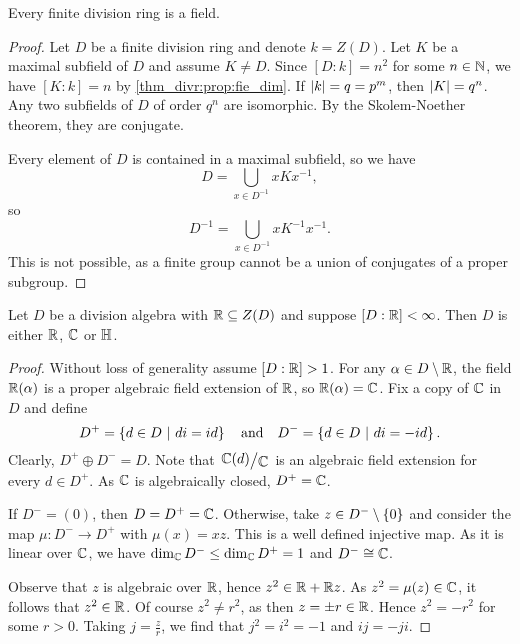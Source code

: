 \begin{izrek}
Every finite division ring is a field.
\end{izrek}

\begin{proof}
Let $D$ be a finite division ring and denote $k = Z(D)$. Let $K$ be
a maximal subfield of $D$ and assume $K \ne D$. Since
$[D : k] = n^2$ for some $n \in \mathbb{N}$, we have $[K : k] = n$ by
\ref{thm_divr:prop:fie_dim}. If $\left\lvert k\right\rvert = q = p^m$, then
$\left\lvert K\right\rvert = q^n$. Any two subfields of $D$ of order $q^n$ are
isomorphic. By the Skolem-Noether theorem, they are conjugate.

Every element of $D$ is contained in a maximal subfield, so we have
\[
D = \bigcup_{x \in D^{-1}} x K x^{-1},
\]
so
\[
D^{-1} = \bigcup_{x \in D^{-1}} x K^{-1} x^{-1}.
\]
This is not possible, as a finite group cannot be a union of
conjugates of a proper subgroup.
\end{proof}

\begin{izrek}[Frobenius]
Let $D$ be a division algebra with $\mathbb{R} \subseteq Z(D)$ and suppose
$[D : \mathbb{R}] < \infty$. Then $D$ is either $\mathbb{R}$, $\mathbb{C}$ or $\mathbb{H}$.
\end{izrek}

\begin{proof}
Without loss of generality assume $[D : \mathbb{R}] > 1$. For any
$\alpha \in D \setminus \mathbb{R}$, the field $\mathbb{R}(\alpha)$ is a proper
algebraic field extension of $\mathbb{R}$, so $\mathbb{R}(\alpha) = \mathbb{C}$. Fix a copy
of $\mathbb{C}$ in $D$ and define
\[
D^+ = \left\{d \in D~\middle\vert~di = id\right\}
\quad \text{and} \quad
D^- = \left\{d \in D~\middle\vert~di = -id\right\}.
\]
Clearly, $D^+ \oplus D^- = D$. Note that $\kvoc{\C(d)}{\C}$ is an
algebraic field extension for every $d \in D^+$. As $\mathbb{C}$ is
algebraically closed, $D^+ = \mathbb{C}$.

If $D^- = (0)$, then $D = D^+ = \mathbb{C}$. Otherwise, take
$z \in D^- \setminus \left\{0\right\}$ and consider the map
$\mu \colon D^- \to D^+$ with $\mu(x) = xz$. This is a well defined
injective map. As it is linear over $\mathbb{C}$, we have
$\dim_{\mathbb{C}} D^- \leq \dim_{\mathbb{C}} D^+ = 1$ and $D^- \cong \mathbb{C}$.

Observe that $z$ is algebraic over $\mathbb{R}$, hence $z^2 \in \mathbb{R} + \mathbb{R} z$.
As $z^2 = \mu(z) \in \mathbb{C}$, it follows that $z^2 \in \mathbb{R}$. Of course
$z^2 \ne r^2$, as then $z = \pm r \in \mathbb{R}$. Hence $z^2 = -r^2$ for
some $r > 0$. Taking $j = \frac{z}{r}$, we find that
$j^2 = i^2 = -1$ and $ij = -ji$.
\end{proof}

